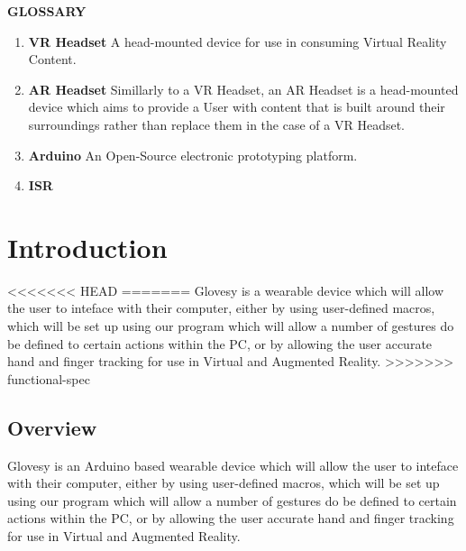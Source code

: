 \documentclass[12pt,a4paper,oneside]{book}
\theoremstyle{plain}
\numberwithin{equation}{chapter}
\renewcommand{\contentsname}{\hfill\bfseries\Large TABLE OF CONTENTS \hfill}
\newcounter{Chapnum}
\newcounter{Secnum}
\begin{document}
\newpage
\begin {center}
    \large\textbf{GLOSSARY}
\end{center}
\begin{enumerate}
    \item \textbf{VR Headset} A head-mounted device for use in consuming Virtual Reality Content.
    \item \textbf{AR Headset} Simillarly to a VR Headset, an AR Headset is a head-mounted device which aims to provide a User with content that is built around their surroundings rather than replace them in the case of a VR Headset.
    \item \textbf{Arduino} An Open-Source electronic prototyping platform.
    \item \textbf{ISR} 
\end{enumerate}



\newpage
\tableofcontents


\newpage
\renewcommand*\thesection{\arabic{Chapnum}.\arabic{Secnum}}
\chapter*{Introduction}

<<<<<<< HEAD
=======
\noindent Glovesy is a wearable device which will allow the user to inteface with their computer, either by using user-defined macros, which will be set up using our program which will allow a number of gestures do be defined to certain actions within the PC, or by allowing the user accurate hand and finger tracking for use in Virtual and Augmented Reality.
\vspace{2cm}
>>>>>>> functional-spec

\section{Overview}

\noindent Glovesy is an Arduino based wearable device which will allow the user to inteface with their computer, either by using user-defined macros, which will be set up using our program which will allow a number of gestures do be defined to certain actions within the PC, or by allowing the user accurate hand and finger tracking for use in Virtual and Augmented Reality.
\end{document}
